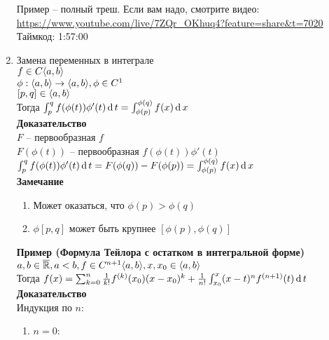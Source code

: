 \documentclass[12pt]{article}
\begin{document}
\begin{enumerate}
    Пример -- полный треш. Если вам надо, смотрите видео:\\
    \url{https://www.youtube.com/live/7ZQr_OKhuq4?feature=share&t=7020}\\
    Таймкод: 1:57:00
    \item Замена переменных в интеграле\\
    $f \in C\langle a, b \rangle$\\
    $\phi: \langle a, b \rangle \rightarrow \langle a, b \rangle, \phi \in C^1$\\
    $[p,q] \in \langle a, b \rangle$\\
    Тогда $\int_p^q f(\phi(t))\phi'(t)\operatorname{d} t = \int_{\phi(p)}^{\phi(q)} f(x)\operatorname{d} x$\\
    \textbf{Доказательство}\\
    $F$ -- первообразная $f$\\
    $F(\phi(t))$ -- первообразная $f(\phi(t))\phi'(t)$\\
    $\int_p^q f(\phi(t))\phi'(t)\operatorname{d} t = F(\phi(q)) - F(\phi(p)) = \int_{\phi(p)}^{\phi(q)} f(x)\operatorname{d} x$\\
    \textbf{Замечание}
    \begin{enumerate}
        \item Может оказаться, что $\phi(p) > \phi(q)$
        \item $\phi[p,q]$ может быть крупнее $[\phi(p), \phi(q)]$
    \end{enumerate}
    \textbf{Пример (Формула Тейлора с остатком в интегральной форме)}\\
    $a,b \in \overline{\mathbb{R}}, a < b, f \in C^{n+1}\langle a, b \rangle, x, x_0 \in \langle a, b \rangle$\\
    Тогда $f(x) = \sum_{k=0}^n \frac1{k!}f^{(k)}(x_0)(x-x_0)^k + \frac1{n!}\int_{x_0}^x (x-t)^n f^{(n+1)}(t)\operatorname{d} t$\\
    \textbf{Доказательство}\\
    Индукция по $n$:
    \begin{enumerate}
        \item $n = 0$:\\

\end{enumerate}
\end{enumerate}
\end{document}
